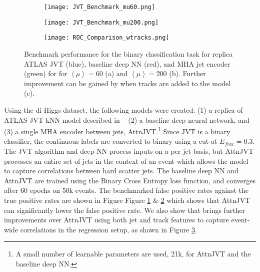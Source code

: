 \begin{figure}[ht]
\centering
\begin{subfigure}{.32\textwidth}
  \centering
  \texttt{[image: JVT\_Benchmark\_mu60.png]}
  \caption{}
  \label{fig:Benchmark:sub1}
\end{subfigure}%
\begin{subfigure}{.32\textwidth}
  \centering
  \texttt{[image: JVT\_Benchmark\_mu200.png]}
  \caption{}
  \label{fig:Benchmark:sub2}
\end{subfigure}
\begin{subfigure}{.32\textwidth}
  \centering
  \texttt{[image: ROC\_Comparison\_wtracks.png]}
  \caption{}
  \label{fig:Benchmark:sub3}
\end{subfigure}
\caption{Benchmark performance for the binary classification task for replica ATLAS JVT (blue), baseline deep NN (red), and MHA jet encoder (green) for for $\left<\mu\right>=60$ (a) and $\left<\mu\right>=200$ (b). Further improvement can be gained by \myname{} when tracks are added to the model (c). }
\label{fig:Benchmark}
\end{figure}

Using the di-Higgs dataset, the following models were created: (1) a replica of ATLAS JVT kNN model described in ~\cite{ATLAS-CONF-2014-018} (2) a baseline deep neural network, and (3) a single MHA encoder between jets, AttnJVT.\footnote{A small number of learnable parameters are used, 21k, for AttnJVT and the baseline deep NN.} Since JVT is a binary classifier, the continuous labels are converted to binary using a cut at $E_{frac}=0.3$. The JVT algorithm and deep NN process inputs on a per jet basis, but AttnJVT processes an entire set of jets in the context of an event which allows the model to capture correlations between hard scatter jets. The baseline deep NN and AttnJVT are trained using the Binary Cross Entropy loss function, and converges after 60 epochs on 50k events. The benchmarked false positive rates against the true positive rates are shown in Figure Figure \ref{fig:Benchmark:sub1} \& \ref{fig:Benchmark:sub2} which shows that AttnJVT can significantly lower the false positive rate. We also show that \myname{} brings further improvements over AttnJVT using both jet and track features to capture event-wide correlations in the regression setup, as shown in Figure \ref{fig:Benchmark:sub3}.
